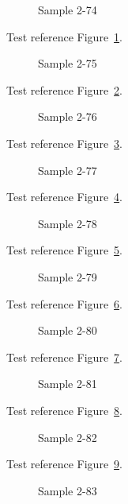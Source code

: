 \begin{figure}[tbhp]
\caption{Sample 2-74}
\label{fig:sample-2-74}
\end{figure}

Test reference Figure~\ref{fig:sample-2-74}.

\begin{figure}[tbhp]
\caption{Sample 2-75}
\label{fig:sample-2-75}
\end{figure}

Test reference Figure~\ref{fig:sample-2-75}.

\begin{figure}[tbhp]
\caption{Sample 2-76}
\label{fig:sample-2-76}
\end{figure}

Test reference Figure~\ref{fig:sample-2-76}.

\begin{figure}[tbhp]
\caption{Sample 2-77}
\label{fig:sample-2-77}
\end{figure}

Test reference Figure~\ref{fig:sample-2-77}.

\begin{figure}[tbhp]
\caption{Sample 2-78}
\label{fig:sample-2-78}
\end{figure}

Test reference Figure~\ref{fig:sample-2-78}.

\begin{figure}[tbhp]
\caption{Sample 2-79}
\label{fig:sample-2-79}
\end{figure}

Test reference Figure~\ref{fig:sample-2-79}.

\begin{figure}[tbhp]
\caption{Sample 2-80}
\label{fig:sample-2-80}
\end{figure}

Test reference Figure~\ref{fig:sample-2-80}.

\begin{figure}[tbhp]
\caption{Sample 2-81}
\label{fig:sample-2-81}
\end{figure}

Test reference Figure~\ref{fig:sample-2-81}.

\begin{figure}[tbhp]
\caption{Sample 2-82}
\label{fig:sample-2-82}
\end{figure}

Test reference Figure~\ref{fig:sample-2-82}.

\begin{figure}[tbhp]
\caption{Sample 2-83}
\label{fig:sample-2-83}
\end{figure}

